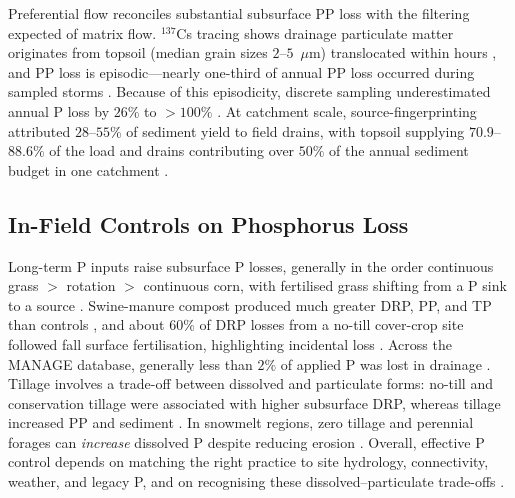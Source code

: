 \documentclass[11pt]{article}
\begin{document}
Preferential flow reconciles substantial subsurface PP loss with the filtering
expected of matrix flow. $^{137}$Cs tracing shows drainage particulate matter
originates from topsoil (median grain sizes $2$--$5$~$\mu$m) translocated
within hours \parencite{Laubel1999,Uusitalo2001}, and PP loss is
episodic---nearly one-third of annual PP loss occurred during sampled storms
\parencite{Laubel1999,Grant1996}. Because of this episodicity, discrete
sampling underestimated annual P loss by $26\%$ to $>100\%$
\parencite{Grant1996}. At catchment scale, source-fingerprinting attributed
$28$--$55\%$ of sediment yield to field drains, with topsoil supplying
$70.9$--$88.6\%$ of the load and drains contributing over $50\%$ of the annual
sediment budget in one catchment \parencite{Walling2002,Chapman2005}.

\subsection{In-Field Controls on Phosphorus Loss}

Long-term P inputs raise subsurface P losses, generally in the order
continuous grass $>$ rotation $>$ continuous corn, with fertilised grass
shifting from a P sink to a source \parencite{Zhang2015b}. Swine-manure
compost produced much greater DRP, PP, and TP than controls
\parencite{Zhang2015}, and about $60\%$ of DRP losses from a no-till
cover-crop site followed fall surface fertilisation, highlighting incidental
loss \parencite{Macrae2023,Mumbi2025b}. Across the MANAGE database, generally
less than $2\%$ of applied P was lost in drainage \parencite{Christianson2016}.
Tillage involves a trade-off between dissolved and particulate forms: no-till
and conservation tillage were associated with higher subsurface DRP, whereas
tillage increased PP and sediment
\parencite{Ni2020,Macrae2023,Koskiaho2002}. In snowmelt regions, zero tillage
and perennial forages can \emph{increase} dissolved P despite reducing erosion
\parencite{Baulch2019}. Overall, effective P control depends on matching the
right practice to site hydrology, connectivity, weather, and legacy P, and on
recognising these dissolved--particulate trade-offs
\parencite{King2015,Ni2020,Baulch2019}.

\printbibliography
\end{document}
